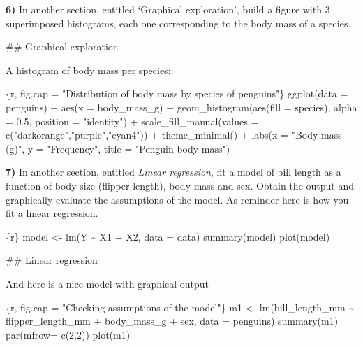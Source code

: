 \documentclass[
  letterpaper,
  DIV=11,
  numbers=noendperiod]{scrreprt}
\newenvironment{Shaded}{\begin{snugshade}}{\end{snugshade}}
\newcommand{\FunctionTok}[1]{\textcolor[rgb]{0.28,0.35,0.67}{#1}}
\newcommand{\InformationTok}[1]{\textcolor[rgb]{0.37,0.37,0.37}{#1}}
\newcommand{\NormalTok}[1]{\textcolor[rgb]{0.00,0.23,0.31}{#1}}
\begin{document}
\textbf{6)} In another section, entitled `Graphical exploration', build
a figure with 3 superimposed histograms, each one corresponding to the
body mass of a species.

\begin{Shaded}
\begin{Highlighting}[]
\FunctionTok{\#\# Graphical exploration}

\NormalTok{A histogram of body mass per species:}

\InformationTok{\textasciigrave{}\textasciigrave{}\textasciigrave{}\{r, fig.cap = "Distribution of body mass by species of penguins"\}}
\InformationTok{  ggplot(data = penguins) +}
\InformationTok{  aes(x = body\_mass\_g) +}
\InformationTok{  geom\_histogram(aes(fill = species),}
\InformationTok{                 alpha = 0.5,}
\InformationTok{                 position = "identity") +}
\InformationTok{  scale\_fill\_manual(values = c("darkorange","purple","cyan4")) +}
\InformationTok{  theme\_minimal() +}
\InformationTok{  labs(x = "Body mass (g)",}
\InformationTok{       y = "Frequency",}
\InformationTok{       title = "Penguin body mass")}
\InformationTok{\textasciigrave{}\textasciigrave{}\textasciigrave{}}
\end{Highlighting}
\end{Shaded}

\textbf{7)} In another section, entitled \emph{Linear regression}, fit a
model of bill length as a function of body size (flipper length), body
mass and sex. Obtain the output and graphically evaluate the assumptions
of the model. As reminder here is how you fit a linear regression.

\begin{Shaded}
\begin{Highlighting}[]
\InformationTok{\textasciigrave{}\textasciigrave{}\textasciigrave{}\{r\}}
\InformationTok{model \textless{}{-} lm(Y \textasciitilde{}  X1 + X2, data = data)}
\InformationTok{summary(model)}
\InformationTok{plot(model)}
\InformationTok{\textasciigrave{}\textasciigrave{}\textasciigrave{}}
\end{Highlighting}
\end{Shaded}

\begin{Shaded}
\begin{Highlighting}[]
\FunctionTok{\#\# Linear regression}

\NormalTok{And here is a nice model with graphical output}

\InformationTok{\textasciigrave{}\textasciigrave{}\textasciigrave{}\{r, fig.cap = "Checking assumptions of the model"\}}
\InformationTok{m1 \textless{}{-} lm(bill\_length\_mm \textasciitilde{}  flipper\_length\_mm + body\_mass\_g + sex, data = penguins)}
\InformationTok{summary(m1)}
\InformationTok{par(mfrow= c(2,2))}
\InformationTok{plot(m1)}
\InformationTok{\textasciigrave{}\textasciigrave{}\textasciigrave{}}
\end{Highlighting}
\end{Shaded}
\end{document}
